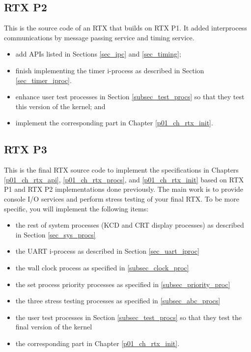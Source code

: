 \subsection{\bf RTX P2} 
This is the source code
of an RTX that builds on RTX P1. It added interprocess communications by message passing service and timing service.
\begin{itemize}
\item add APIs listed in Sections \ref{sec_ipc} and \ref{sec_timing};
\item finish implementing the timer i-process as described in Section  \ref{sec_timer_iproc}.
\item enhance user test processes in Section \ref{subsec_test_procs} so that they test this version of the kernel; and
\item implement the corresponding part in Chapter \ref{p01_ch_rtx_init}.     
 
\end{itemize}

\subsection{\bf RTX P3} 
This is the final RTX source code to implement the specifications
in Chapters \ref{p01_ch_rtx_api}, \ref{p01_ch_rtx_procs}, and \ref{p01_ch_rtx_init}
based on RTX P1 and RTX P2 implementations done previously. The main work is to provide console I/O services and perform stress testing of your final RTX.
To be more specific, you will implement the following items:
  \begin{itemize}
    \item the rest of system processes (KCD and CRT display processes) as described in Section \ref{sec_sys_procs} 
    \item the UART i-process as described in Section \ref{sec_uart_iproc}  
    \item the wall clock process as specified in \ref{subsec_clock_proc}
    \item the set process priority processes as specified in \ref{subsec_priority_proc}
    \item the three stress testing processes as specified in \ref{subsec_abc_procs} 
    \item the user test processes in Section \ref{subsec_test_procs} so that they test the final version of the kernel
    \item the corresponding part in Chapter \ref{p01_ch_rtx_init}.
  \end{itemize}

